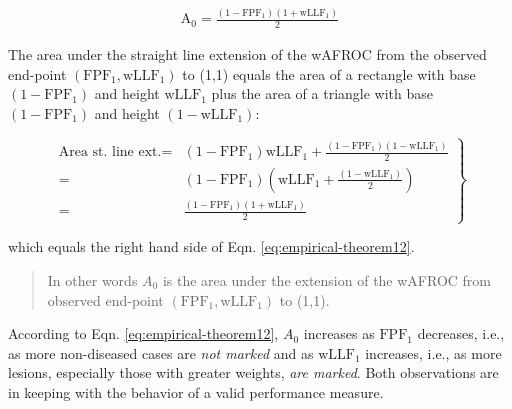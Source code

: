 \documentclass[
]{book}
\begin{document}
\begin{equation}
\begin{aligned}
\text{A}_0 = \frac{\left ( 1-\text{FPF}_1 \right ) \left ( 1+\text{wLLF}_1 \right )}{2}
\end{aligned}
\label{eq:empirical-theorem12}
\end{equation}

The area under the straight line extension of the wAFROC from the observed end-point \(\left ( \text{FPF}_1, \text{wLLF}_1 \right )\) to (1,1) equals the area of a rectangle with base \(\left ( 1-\text{FPF}_1 \right )\) and height \(\text{wLLF}_1\) plus the area of a triangle with base \(\left ( 1-\text{FPF}_1 \right )\) and height \((1-\text{wLLF}_1)\):

\begin{equation}
\left. 
\begin{aligned}
\text{Area st. line ext.} =& \left ( 1-\text{FPF}_1 \right )\text{wLLF}_1 
+ \frac{\left( 1-\text{FPF}_1 \right )\left ( 1-\text{wLLF}_1 \right )}{2}  \\
=& \left ( 1-\text{FPF}_1 \right )\left( \text{wLLF}_1 + \frac{\left ( 1-\text{wLLF}_1 \right )}{2} \right) \\
=&
\frac{\left ( 1-\text{FPF}_1 \right ) \left ( 1+\text{wLLF}_1 \right )}{2}
\end{aligned}
\right \} 
\label{eq:empirical-theorem12a}
\end{equation}

which equals the right hand side of Eqn. \eqref{eq:empirical-theorem12}.

\begin{quote}
In other words \(A_0\) is the area under the extension of the wAFROC from observed end-point \(\left ( \text{FPF}_1, \text{wLLF}_1 \right )\) to (1,1).
\end{quote}

According to Eqn. \eqref{eq:empirical-theorem12}, \(A_0\) increases as \(\text{FPF}_1\) decreases, i.e., as more non-diseased cases are \emph{not marked} and as \(\text{wLLF}_1\) increases, i.e., as more lesions, especially those with greater weights, \emph{are marked}. Both observations are in keeping with the behavior of a valid performance measure.
\end{document}
